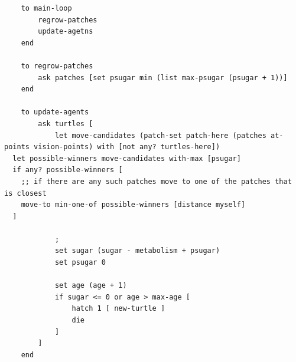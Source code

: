 \documentclass[3p,times,procedia]{elsarticle}
\begin{document}


\begin{lstlisting}
	to main-loop
    	regrow-patches
        update-agetns
    end
    
    to regrow-patches
    	ask patches [set psugar min (list max-psugar (psugar + 1))]
    end
    
    to update-agents
    	ask turtles [
    		let move-candidates (patch-set patch-here (patches at-points vision-points) with [not any? turtles-here])
  let possible-winners move-candidates with-max [psugar]
  if any? possible-winners [
    ;; if there are any such patches move to one of the patches that is closest
    move-to min-one-of possible-winners [distance myself]
  ]
            
            ; 
            set sugar (sugar - metabolism + psugar)
  			set psugar 0
            
    		set age (age + 1)
    		if sugar <= 0 or age > max-age [
      			hatch 1 [ new-turtle ]
      			die
    		]
  		]
    end
    
\end{lstlisting}
\end{document}
